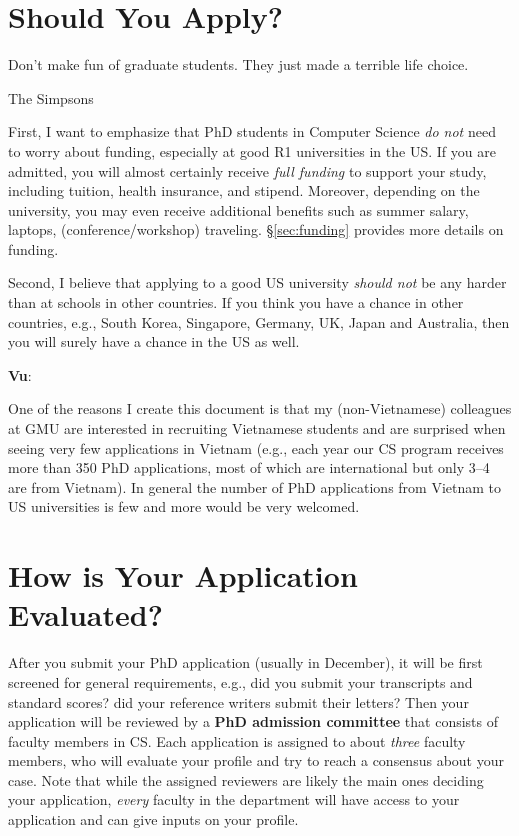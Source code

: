 \documentclass[11pt]{article}
\newenvironment{commentbox}[1][]{
\small
    \begin{cbox}
    \textbf{#1}: 
 }{
   \end{cbox}
}
\begin{document}
\section{Should You Apply?}
\epigraph{\vspace{-0.2in} Don't make fun of graduate students. They just made a terrible life choice.}{The Simpsons}

First, I want to emphasize that PhD students in Computer
Science \emph{do not} need to worry about funding, especially at good R1
universities in the US. If you are admitted, you will almost certainly
receive \emph{full funding} to support your study, including tuition,
health insurance, and stipend. Moreover, depending on the university,
you may even receive additional benefits such as summer salary, laptops, (conference/workshop) traveling. \S\ref{sec:funding} provides more details on funding.

Second, I believe that applying to a good US university \emph{should not} be any
harder than at schools in other countries. If you think you have a chance in other countries, e.g., South Korea, Singapore, Germany, UK, Japan and Australia, then you will surely have a chance in the US as well.

\begin{commentbox}[Vu]
One of the reasons I create this document is that my (non-Vietnamese) colleagues at GMU are interested in 
recruiting Vietnamese students and are surprised when seeing very few applications in Vietnam (e.g., each year our CS program receives more than 350 PhD applications, most of which are international but only 3--4 are from Vietnam). In general the number of
PhD applications from Vietnam to US universities is few and  more would be very welcomed. 
\end{commentbox}



\section{How is Your Application Evaluated?}

After you submit your PhD application (usually in December), it will be first screened
for general requirements, e.g., did you submit your transcripts and standard scores? did your reference writers submit their letters?
Then your application will be reviewed by a
\textbf{PhD admission committee} that consists of faculty members in CS. Each application is assigned to about \emph{three} faculty members, who will evaluate your profile and try to reach a consensus about your case.  Note that while the assigned reviewers are likely the main ones deciding your application, \emph{every} faculty in the department will have access to your application and can give inputs on your profile.
\end{document}
